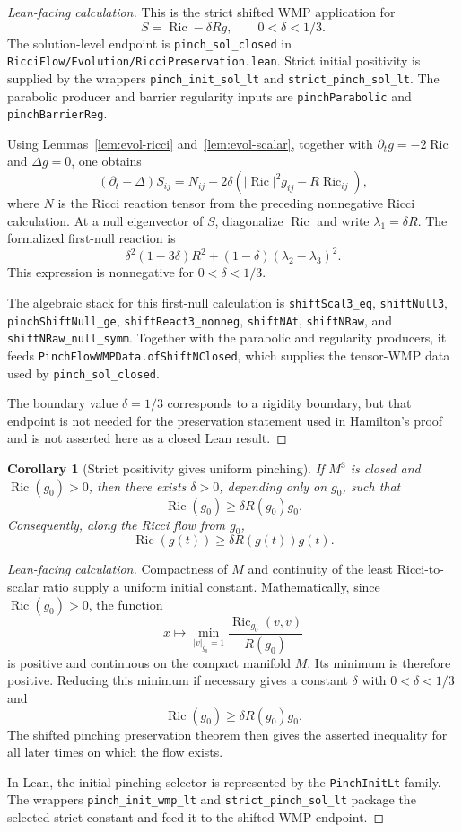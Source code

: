 \documentclass[11pt]{article}
\theoremstyle{plain}
\newtheorem{corollary}[theorem]{Corollary}
\theoremstyle{definition}
\theoremstyle{remark}
\newcommand{\Ric}{\operatorname{Ric}}
\newcommand{\norm}[1]{\left|#1\right|}
\newcommand{\del}{\delta}
\newcommand{\leanref}[1]{\nolinkurl{#1}}
\newcommand{\leanfile}[1]{\nolinkurl{#1}}
\newcommand{\rffile}[1]{\leanfile{#1}}
\begin{document}
\begin{proof}[Lean-facing calculation]
This is the strict shifted WMP application for
\[
S=\Ric-\del Rg,
\qquad 0<\del<1/3.
\]
The solution-level endpoint is \leanref{pinch_sol_closed} in
\rffile{RicciFlow/Evolution/RicciPreservation.lean}.  Strict initial positivity
is supplied by the wrappers \leanref{pinch_init_sol_lt} and
\leanref{strict_pinch_sol_lt}.  The parabolic producer and barrier regularity
inputs are \leanref{pinchParabolic} and \leanref{pinchBarrierReg}.

Using Lemmas~\ref{lem:evol-ricci} and~\ref{lem:evol-scalar}, together with
\(\partial_tg=-2\Ric\) and \(\Delta g=0\), one obtains
\[
(\partial_t-\Delta)S_{ij}
=
N_{ij}
-2\del\left(\norm{\Ric}^2g_{ij}-R\Ric_{ij}\right),
\]
where \(N\) is the Ricci reaction tensor from the preceding nonnegative Ricci
calculation.  At a null eigenvector of \(S\), diagonalize \(\Ric\) and write
\(\lambda_1=\del R\).  The formalized first-null reaction is
\[
  \del^2(1-3\del)R^2
  +(1-\del)(\lambda_2-\lambda_3)^2.
\]
This expression is nonnegative for \(0<\del<1/3\).

The algebraic stack for this first-null calculation is
\leanref{shiftScal3_eq}, \leanref{shiftNull3},
\leanref{pinchShiftNull_ge}, \leanref{shiftReact3_nonneg},
\leanref{shiftNAt}, \leanref{shiftNRaw}, and
\leanref{shiftNRaw_null_symm}.  Together with the parabolic and regularity
producers, it feeds \leanref{PinchFlowWMPData.ofShiftNClosed}, which supplies
the tensor-WMP data used by \leanref{pinch_sol_closed}.

The boundary value \(\del=1/3\) corresponds to a rigidity boundary, but that
endpoint is not needed for the preservation statement used in Hamilton's proof
and is not asserted here as a closed Lean result.
\end{proof}

\begin{corollary}[Strict positivity gives uniform pinching]
\label{cor:strict-positive-gives-pinching}
If $M^3$ is closed and $\Ric(g_0)>0$, then there exists $\del>0$, depending
only on $g_0$, such that
\[
\Ric(g_0)\ge\del R(g_0)g_0.
\]
Consequently, along the Ricci flow from $g_0$,
\[
\Ric(g(t))\ge\del R(g(t))g(t).
\]
\end{corollary}

\begin{proof}[Lean-facing calculation]
Compactness of \(M\) and continuity of the least Ricci-to-scalar ratio supply a
uniform initial constant.  Mathematically, since \(\Ric(g_0)>0\), the function
\[
x\mapsto \min_{\norm{v}_{g_0}=1}\frac{\Ric_{g_0}(v,v)}{R(g_0)}
\]
is positive and continuous on the compact manifold \(M\).  Its minimum is
therefore positive.  Reducing this minimum if necessary gives a constant
\(\del\) with \(0<\del<1/3\) and
\[
\Ric(g_0)\ge \del R(g_0)g_0.
\]
The shifted pinching preservation theorem then gives the asserted inequality
for all later times on which the flow exists.

In Lean, the initial pinching selector is represented by the
\leanref{PinchInitLt} family.  The wrappers \leanref{pinch_init_wmp_lt} and
\leanref{strict_pinch_sol_lt} package the selected strict constant and feed it
to the shifted WMP endpoint.
\end{proof}
\end{document}
